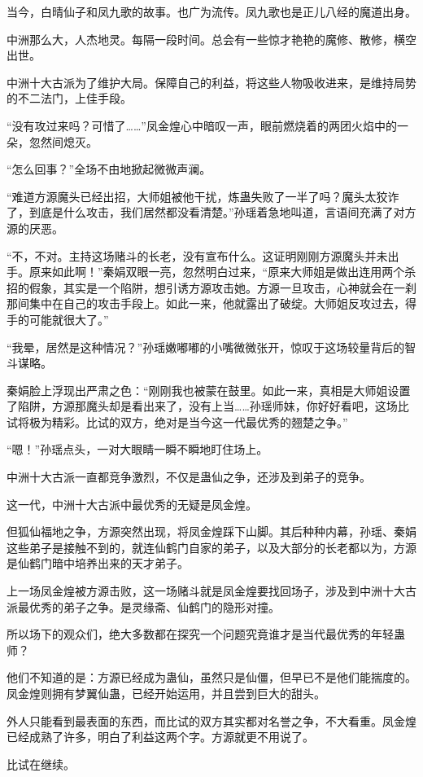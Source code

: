 \begin{this_body}
当今，白晴仙子和凤九歌的故事。也广为流传。凤九歌也是正儿八经的魔道出身。

中洲那么大，人杰地灵。每隔一段时间。总会有一些惊才艳艳的魔修、散修，横空出世。

中洲十大古派为了维护大局。保障自己的利益，将这些人物吸收进来，是维持局势的不二法门，上佳手段。

“没有攻过来吗？可惜了……”凤金煌心中暗叹一声，眼前燃烧着的两团火焰中的一朵，忽然间熄灭。

“怎么回事？”全场不由地掀起微微声澜。

“难道方源魔头已经出招，大师姐被他干扰，炼蛊失败了一半了吗？魔头太狡诈了，到底是什么攻击，我们居然都没看清楚。”孙瑶着急地叫道，言语间充满了对方源的厌恶。

“不，不对。主持这场赌斗的长老，没有宣布什么。这证明刚刚方源魔头并未出手。原来如此啊！”秦娟双眼一亮，忽然明白过来，“原来大师姐是做出连用两个杀招的假象，其实是一个陷阱，想引诱方源攻击她。方源一旦攻击，心神就会在一刹那间集中在自己的攻击手段上。如此一来，他就露出了破绽。大师姐反攻过去，得手的可能就很大了。”

“我晕，居然是这种情况？”孙瑶嫩嘟嘟的小嘴微微张开，惊叹于这场较量背后的智斗谋略。

秦娟脸上浮现出严肃之色：“刚刚我也被蒙在鼓里。如此一来，真相是大师姐设置了陷阱，方源那魔头却是看出来了，没有上当……孙瑶师妹，你好好看吧，这场比试将极为精彩。比试的双方，绝对是当今这一代最优秀的翘楚之争。”

“嗯！”孙瑶点头，一对大眼睛一瞬不瞬地盯住场上。

中洲十大古派一直都竞争激烈，不仅是蛊仙之争，还涉及到弟子的竞争。

这一代，中洲十大古派中最优秀的无疑是凤金煌。

但狐仙福地之争，方源突然出现，将凤金煌踩下山脚。其后种种内幕，孙瑶、秦娟这些弟子是接触不到的，就连仙鹤门自家的弟子，以及大部分的长老都以为，方源是仙鹤门暗中培养出来的天才弟子。

上一场凤金煌被方源击败，这一场赌斗就是凤金煌要找回场子，涉及到中洲十大古派最优秀的弟子之争。是灵缘斋、仙鹤门的隐形对撞。

所以场下的观众们，绝大多数都在探究一个问题究竟谁才是当代最优秀的年轻蛊师？

他们不知道的是：方源已经成为蛊仙，虽然只是仙僵，但早已不是他们能揣度的。凤金煌则拥有梦翼仙蛊，已经开始运用，并且尝到巨大的甜头。

外人只能看到最表面的东西，而比试的双方其实都对名誉之争，不大看重。凤金煌已经成熟了许多，明白了利益这两个字。方源就更不用说了。

比试在继续。


\end{this_body}
